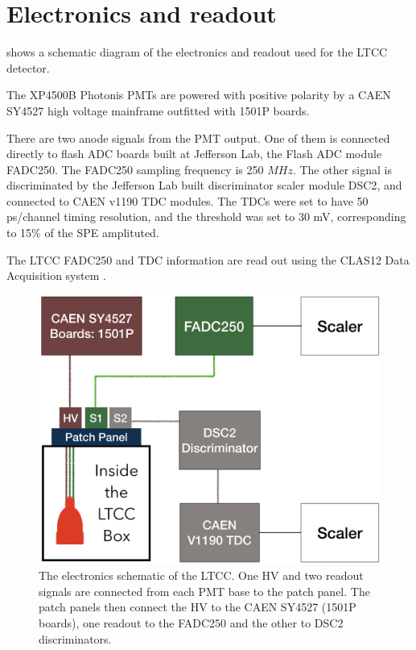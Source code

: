 \section{Electronics and readout}

 shows a schematic diagram of the electronics and readout used for the LTCC detector.

The XP4500B Photonis PMTs are powered with positive polarity by a CAEN SY4527 high voltage mainframe outfitted with 1501P boards.

There are two anode signals from the PMT output. One of them is connected directly to flash ADC
boards built at Jefferson Lab, the Flash ADC module FADC250\cite{daq2019}. The FADC250 sampling frequency is 250 $MHz$.
The other signal is discriminated by the Jefferson Lab built discriminator scaler module DSC2\cite{daq2019}, and connected to CAEN v1190 TDC modules.
The TDCs were set to have 50 ps/channel timing resolution, and the threshold was set to 30 mV, corresponding to 15\% of the SPE amplituted.

The LTCC FADC250 and TDC information are read out using the CLAS12 Data Acquisition system \cite{daq2019}.

\begin{figure}
	\centering
	\includegraphics[width=0.99\columnwidth,keepaspectratio]{img/electronicScheme.png}
	\caption{The electronics schematic of the LTCC. One HV and two readout signals are connected from each PMT base to the patch panel.
		     The patch panels then connect the HV to the CAEN SY4527 (1501P boards), one readout to the FADC250
             and the other to DSC2 discriminators.}
	\label{fig:electronicScheme}
\end{figure}



